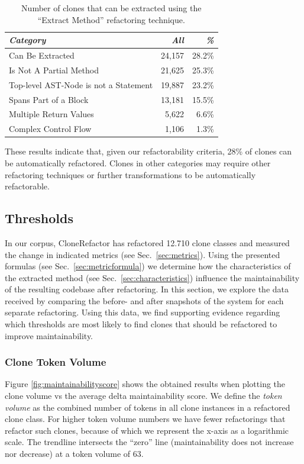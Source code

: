 \documentclass[sigconf,review, table]{acmart}
\begin{document}
\begin{table}[H]
\centering
\begin{tabular}{@{}lrr@{}}
\toprule
\textit{\textbf{Category}} & \textit{\textbf{All}} & \textit{\textbf{\%}} \\ \midrule
Can Be Extracted & 24,157 & 28.2\%  \\
Is Not A Partial Method & 21,625 & 25.3\% \\
Top-level AST-Node is not a Statement & 19,887 & 23.2\% \\
Spans Part of a Block & 13,181 & 15.5\%  \\
Multiple Return Values & 5,622 & 6.6\%  \\
Complex Control Flow & 1,106 & 1.3\% \\
\end{tabular}
\caption{Number of clones that can be extracted using the ``Extract Method'' refactoring technique.}
\label{tab:refactorability}
\end{table}

These results indicate that, given our refactorability criteria, 28\% of clones can be automatically refactored. Clones in other categories may require other refactoring techniques or further transformations to be automatically refactorable.

\subsection{Thresholds}
In our corpus, CloneRefactor has refactored 12.710 clone classes and measured the change in indicated metrics (see Sec.~\ref{sec:metrics}). Using the presented formulas (see Sec.~\ref{sec:metricformula}) we determine how the characteristics of the extracted method (see Sec.~\ref{sec:characteristics}) influence the maintainability of the resulting codebase after refactoring. In this section, we explore the data received by comparing the before- and after snapshots of the system for each separate refactoring. Using this data, we find supporting evidence regarding which thresholds are most likely to find clones that should be refactored to improve maintainability.

\subsubsection{Clone Token Volume}
Figure \ref{fig:maintainabilityscore} shows the obtained results when plotting the clone volume vs the average delta maintainability score. We define the \textit{token volume} as the combined number of tokens in all clone instances in a refactored clone class. For higher token volume numbers we have fewer refactorings that refactor such clones, because of which we represent the x-axis as a logarithmic scale. The trendline intersects the ``zero'' line (maintainability does not increase nor decrease) at a token volume of 63.
\end{document}
